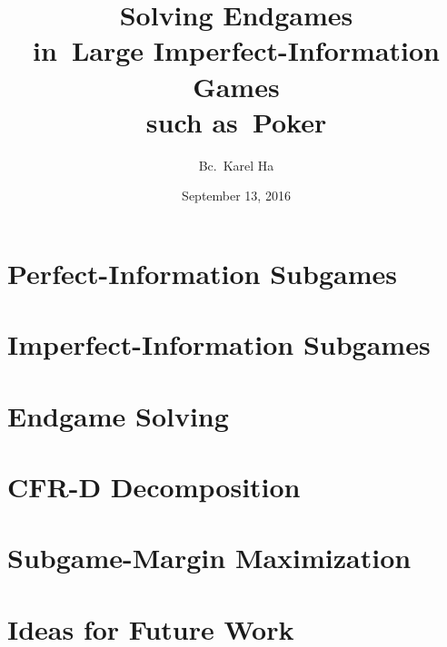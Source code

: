 \documentclass{beamer}
\title{Solving Endgames \\in~Large Imperfect-Information Games \\such as~Poker}
\date{September 13, 2016}
\author{Bc.~Karel Ha}
\institute{Department of~Applied Mathematics \\Charles University}
\begin{document}
  \maketitle

  \section{Perfect-Information Subgames}

  \section{Imperfect-Information Subgames}

  \section{Endgame Solving}

  \section{CFR-D Decomposition}

  \section{Subgame-Margin Maximization}

  \section{Ideas for Future Work}
\end{document}
